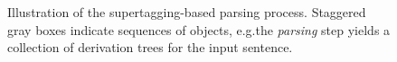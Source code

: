 \documentclass[../document.tex]{subfiles}
\begin{document}
    \begin{figure}
        
        \caption{\label{fig:parsing:overview}
            Illustration of the supertagging-based parsing process.
            Staggered gray boxes indicate sequences of objects, e.g.\@ the \emph{parsing} step yields a collection of derivation trees for the input sentence.
        }
    \end{figure}

    
    
    
    
    \ifSubfilesClassLoaded{%
        \printindex
    }{}
\end{document}
